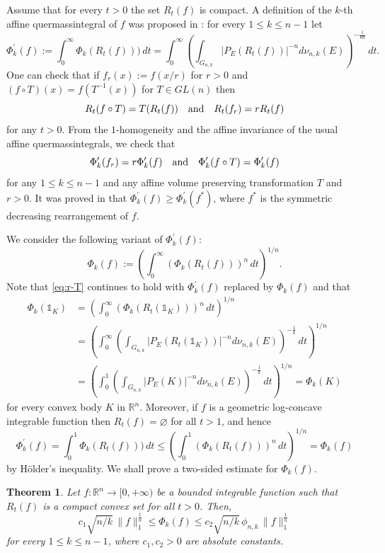 \documentclass[11pt,leqno]{article}
\newtheorem{theorem}{Theorem}[section]
\theoremstyle{definition}
\theoremstyle{remark}
\numberwithin{equation}{section}
\newcommand{\ls}{\leqslant}
\newcommand{\gr}{\geqslant}
\newcommand{\1}{\textbf{1}}
\begin{document}
Assume that for every $t>0$ the set $R_t(f)$ is compact. A definition of the $k$-th
affine quermassintegral of $f$ was proposed in \cite{Dann-Paouris-Pivovarov-flag}: for every $1\ls k\ls n-1$ let
$$\Phi^{\prime}_k(f):=\int_0^{\infty}\Phi_k(R_t(f)))\,dt
=\int_0^{\infty}\left(\int_{G_{n,k}}|P_E(R_t(f))|^{-n}d\nu_{n,k}(E)\right)^{-\frac{1}{kn}}\,dt.$$
One can check that if $f_r(x):=f(x/r)$ for $r>0$ and $(f\circ T)(x)=f(T^{-1}(x))$ for $T\in GL(n)$ then
$$R_t(f\circ T)=T(R_t(f))\quad\hbox{and}\quad R_t(f_r)=rR_t(f)$$
for any $t>0$. From the $1$-homogeneity and the affine invariance of the usual affine quermassintegrals, we check that
\begin{equation}\label{eq:r-T}\Phi^{\prime}_k(f_r)=r\Phi^{\prime}_k(f)\quad\hbox{and}\quad \Phi^{\prime}_k(f\circ T)=\Phi^{\prime}_k(f)\end{equation}
for any $1\ls k\ls n-1$ and any affine volume preserving transformation $T$ and $r>0$. It was proved in
\cite[Theorem~5.5]{Dann-Paouris-Pivovarov-flag}
that $\Phi_k^{\prime}(f)\gr \Phi^{\prime}_k(f^{\ast})$, where $f^{\ast}$ is the symmetric
decreasing rearrangement of $f$.

We consider the following variant of $\Phi^{\prime}_k(f)$:
$$\Phi_k(f):=\left(\int_0^{\infty}(\Phi_k(R_t(f)))^n\,dt\right)^{1/n}.$$
Note that \eqref{eq:r-T} continues to hold with $\Phi_k^{\prime}(f)$ replaced by $\Phi_k(f)$
and that
\begin{align*}
\Phi_k(\mathds{1}_K) &=\left(\int_0^{\infty}(\Phi_k(R_t(\mathds{1}_K)))^n\,dt\right)^{1/n}\\
&=\left(\int_0^{\infty}\left(\int_{G_{n,k}}|P_E(R_t(\mathds{1}_K))|^{-n}d\nu_{n,k}(E)\right)^{-\frac{1}{k}}\,dt\right)^{1/n}\\
&=\left(\int_0^1\left(\int_{G_{n,k}}|P_E(K)|^{-n}d\nu_{n,k}(E)\right)^{-\frac{1}{k}}\,dt\right)^{1/n}=\Phi_k(K)
\end{align*} for every convex body $K$ in ${\mathbb R}^n$. Moreover,
if $f$ is a geometric log-concave integrable function then $R_t(f)=\varnothing$ for all $t>1$, and hence
$$\Phi_k^{\prime}(f)=\int_0^1\Phi_k(R_t(f)))\,dt\ls \left(\int_0^1(\Phi_k(R_t(f)))^n\,dt\right)^{1/n}=\Phi_k(f)$$
by H\"{o}lder's inequality. We shall prove a two-sided estimate for $\Phi_k(f)$.

\begin{theorem}\label{th:functional}Let $f:{\mathbb R}^n\to [0,+\infty)$ be a bounded integrable function
such that $R_t(f)$ is a compact convex set for all $t>0$. Then,
$$c_1\sqrt{n/k}\,\|f\|_1^{\frac{1}{n}}\ls \Phi_k(f)\ls c_2\sqrt{n/k}\,\phi_{n,k}\,\|f\|_1^{\frac{1}{n}}$$
for every $1\ls k\ls n-1$, where $c_1,c_2>0$ are absolute constants.
\end{theorem}
\end{document}
